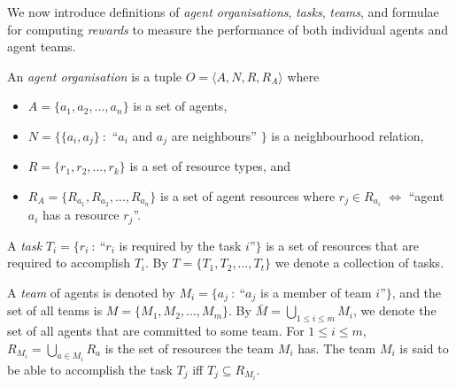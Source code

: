 \documentclass{llncs}
\begin{document}
We now introduce definitions of \emph{agent organisations}, \emph{tasks}, \emph{teams}, and formulae for computing \emph{rewards} to measure the performance of both individual agents and agent teams.

\begin{definition}
An \emph{agent organisation} is a tuple $O=\langle A, N, R, R_A  \rangle$ where
\noindent
\begin{itemize}
\item $A= \{ a_1,a_2,...,a_n \} $ is a set of agents,
\item $N=\{\{a_i,a_j \}\ :$ ``$a_i$ and $a_j$ are neighbours'' $\}$ is a neighbourhood relation,
\item $R=\{r_1,r_2,\dots,r_k\}$ is a set of resource types, and
\item $R_A=\{R_{a_1}, R_{a_2}, \dots, R_{a_n}\}$ is a set of agent resources where $r_j \in R_{a_i} $ $\iff$ ``agent $a_i$ has a resource $r_j$''.
\end{itemize}
\end{definition}

\begin{definition}[Task]
A \emph{task} $T_i=\{r_i\ :\ $``$r_i$ is required by the task $i$''$\}$ is a set of resources that are required to accomplish $T_i$. By $T=\{T_1, T_2,\dots, T_t\}$ we denote a collection of tasks.
\end{definition}

\begin{definition}[Team]
A \emph{team} of agents is denoted by $M_i=\{a_j\ :\ $``$a_j$ is a member of team $i$''$\}$, and the set of all teams is $M=\{M_1, M_2,\dots , M_m\}$. By $\bar{M} = \bigcup_{1\leq i\leq m} M_i$, we denote the set of all agents that are committed to some team. For $1\leq i\leq m$, $R_{M_i}=\bigcup_{a \in M_i}R_{a}$ is the set of resources the team $M_i$ has. The team $M_i$ is said to be able to accomplish the task $T_j$ iff $T_j \subseteq R_{M_i}$.
\end{definition}
\end{document}
